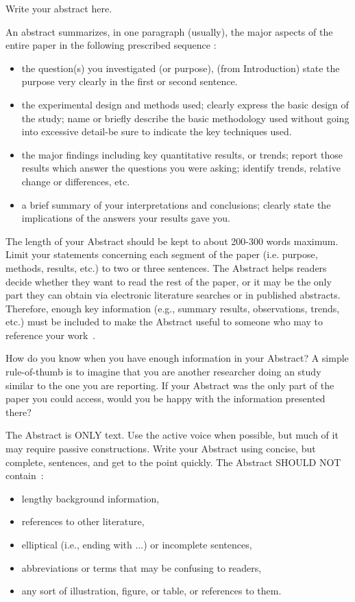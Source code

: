 \documentclass{winslabreport}
\begin{document}
\restoregeometry
\maketitle

\summary
Write your abstract here.

An abstract summarizes, in one paragraph (usually), the major aspects of the entire paper in the following prescribed sequence \cite{Anderson2016}:
\begin{itemize}
\item the question(s) you investigated (or purpose), (from Introduction)
state the purpose very clearly in the first or second sentence.
\item the experimental design and methods used; clearly express the basic design of the study; name or briefly describe the basic methodology used without going into excessive detail-be sure to indicate the key techniques used.
\item the major findings including key quantitative results, or trends; report those results which answer the questions you were asking; identify trends, relative change or differences, etc.
\item a brief summary of your interpretations and conclusions; clearly state the implications of the answers your results gave you.
\end{itemize}

The length of your Abstract should be kept to about 200-300 words maximum. Limit your statements concerning each segment of the paper (i.e. purpose, methods, results, etc.) to two or three sentences. The Abstract helps readers decide whether they want to read the rest of the paper, or it may be the only part they can obtain via electronic literature searches or in published abstracts. Therefore, enough key information (e.g., summary results, observations, trends, etc.) must be included to make the Abstract useful to someone who may to reference your work~\cite{Anderson2016}.

How do you know when you have enough information in your Abstract? A simple rule-of-thumb is to imagine that you are another researcher doing an study similar to the one you are reporting. If your Abstract was the only part of the paper you could access, would you be happy with the information presented there?

The Abstract is ONLY text. Use the active voice when possible, but much of it may require passive constructions. Write your Abstract using concise, but complete, sentences, and get to the point quickly. The Abstract SHOULD NOT contain~\cite{Anderson2016}:
\begin{itemize}
\item  lengthy background information,
\item  references to other literature,
\item  elliptical (i.e., ending with ...) or incomplete sentences,
\item  abbreviations or terms that may be confusing to readers,
\item  any sort of illustration, figure, or table, or references to them.
\end{itemize}
\end{document}
